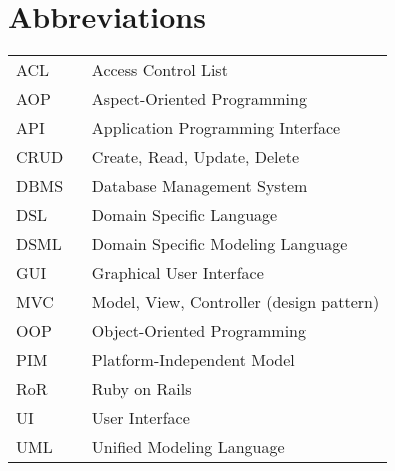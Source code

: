 \chapter*{Abbreviations}

\begin{flushleft}
\begin{tabular}{l p{0.8\linewidth}}
ACL       & Access Control List\\
AOP       & Aspect-Oriented Programming\\
API       & Application Programming Interface\\
CRUD      & Create, Read, Update, Delete\\
DBMS      & Database Management System\\
DSL       & Domain Specific Language\\
DSML      & Domain Specific Modeling Language\\
GUI       & Graphical User Interface\\
MVC       & Model, View, Controller (design pattern)\\
OOP       & Object-Oriented Programming\\
PIM       & Platform-Independent Model\\
RoR       & Ruby on Rails\\
UI        & User Interface\\
UML       & Unified Modeling Language\\
\end{tabular}
\end{flushleft}

